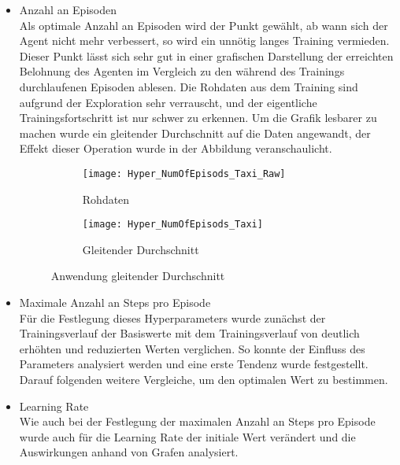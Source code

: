 \begin{itemize}
    \item Anzahl an Episoden\\
    Als optimale Anzahl an Episoden wird der Punkt gewählt, ab wann sich der Agent nicht mehr verbessert, so wird ein unnötig langes Training vermieden. 
    Dieser Punkt lässt sich sehr gut in einer grafischen Darstellung der erreichten Belohnung des Agenten im Vergleich zu den während des Trainings durchlaufenen Episoden ablesen. 
    Die Rohdaten aus dem Training sind aufgrund der Exploration sehr verrauscht, und der eigentliche Trainingsfortschritt ist nur schwer zu erkennen.
    Um die Grafik lesbarer zu machen wurde ein gleitender Durchschnitt auf die Daten angewandt, der Effekt dieser Operation wurde in der Abbildung  veranschaulicht.

    \begin{figure}[H]
        \centering
        \begin{subfigure}{.5\textwidth}
          \centering
          \texttt{[image: Hyper\_NumOfEpisods\_Taxi\_Raw]}
          \caption{Rohdaten}
          \label{fig:NumOfEpisods_Raw}
        \end{subfigure}%
        \begin{subfigure}{.5\textwidth}
          \centering
          \texttt{[image: Hyper\_NumOfEpisods\_Taxi]}
          \caption{Gleitender Durchschnitt}
          \label{fig:NumOfEpisods_clean}
        \end{subfigure}
        \caption{Anwendung gleitender Durchschnitt}
        \label{fig:NumOfEpisods_MovingAVG}
    \end{figure}

    \item Maximale Anzahl an Steps pro Episode\\
    Für die Festlegung dieses Hyperparameters wurde zunächst der Trainingsverlauf der Basiswerte mit dem Trainingsverlauf von deutlich erhöhten und reduzierten Werten verglichen.
    So konnte der Einfluss des Parameters analysiert werden und eine erste Tendenz wurde festgestellt.
    Darauf folgenden weitere Vergleiche, um den optimalen Wert zu bestimmen.

    \item Learning Rate\\
    Wie auch bei der Festlegung der maximalen Anzahl an Steps pro Episode wurde auch für die Learning Rate der initiale Wert verändert und die Auswirkungen anhand von Grafen analysiert.


\end{itemize}
